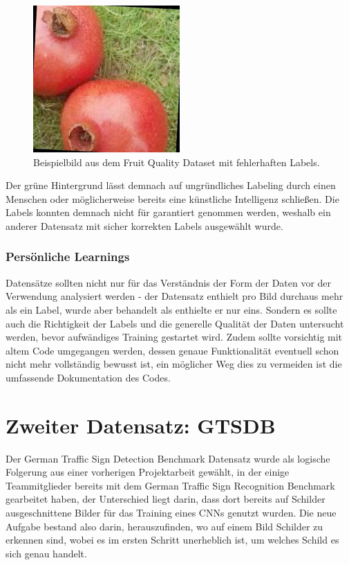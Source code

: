 \documentclass[runningheads]{llncs}
\begin{document}
\begin{figure}[H]
    \centering
    \includegraphics[width=0.5\textwidth]{images/good_pomegrenate_good_lime_error.jpg}
    \caption{Beispielbild aus dem Fruit Quality Dataset mit fehlerhaften Labels.}
    \label{fig1}
\end{figure}

Der grüne Hintergrund lässt demnach auf ungründliches Labeling durch einen Menschen oder möglicherweise bereits eine künstliche Intelligenz schließen. Die Labels konnten demnach nicht für garantiert genommen werden, weshalb ein anderer Datensatz mit sicher korrekten Labels ausgewählt wurde.

\subsubsection{Persönliche Learnings} Datensätze sollten nicht nur für das Verständnis der Form der Daten vor der Verwendung analysiert werden - der Datensatz enthielt pro Bild durchaus mehr als ein Label, wurde aber behandelt als enthielte er nur eins. Sondern es sollte auch die Richtigkeit der Labels und die generelle Qualität der Daten untersucht werden, bevor aufwändiges Training gestartet wird. Zudem sollte vorsichtig mit altem Code umgegangen werden, dessen genaue Funktionalität eventuell schon nicht mehr vollständig bewusst ist, ein möglicher Weg dies zu vermeiden ist die umfassende Dokumentation des Codes.

\section{Zweiter Datensatz: GTSDB}
Der German Traffic Sign Detection Benchmark Datensatz wurde als logische Folgerung aus einer vorherigen Projektarbeit gewählt, in der einige Teammitglieder bereits mit dem German Traffic Sign Recognition Benchmark gearbeitet haben, der Unterschied liegt darin, dass dort bereits auf Schilder ausgeschnittene Bilder für das Training eines CNNs genutzt wurden. Die neue Aufgabe bestand also darin, herauszufinden, wo auf einem Bild Schilder zu erkennen sind, wobei es im ersten Schritt unerheblich ist, um welches Schild es sich genau handelt.
\end{document}
